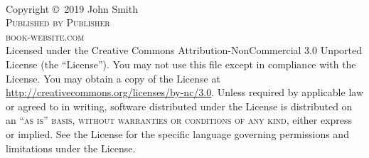 \documentclass[11pt,fleqn]{book} %
\begin{document}

\begingroup
\thispagestyle{empty} %
\vfill
\endgroup


\newpage
~\vfill
\thispagestyle{empty}

\noindent Copyright \copyright\ 2019 John Smith\\ %

\noindent \textsc{Published by Publisher}\\ %

\noindent \textsc{book-website.com}\\ %

\noindent Licensed under the Creative Commons Attribution-NonCommercial 3.0 Unported License (the ``License''). You may not use this file except in compliance with the License. You may obtain a copy of the License at \url{http://creativecommons.org/licenses/by-nc/3.0}. Unless required by applicable law or agreed to in writing, software distributed under the License is distributed on an \textsc{``as is'' basis, without warranties or conditions of any kind}, either express or implied. See the License for the specific language governing permissions and limitations under the License.\\ %
\end{document}
